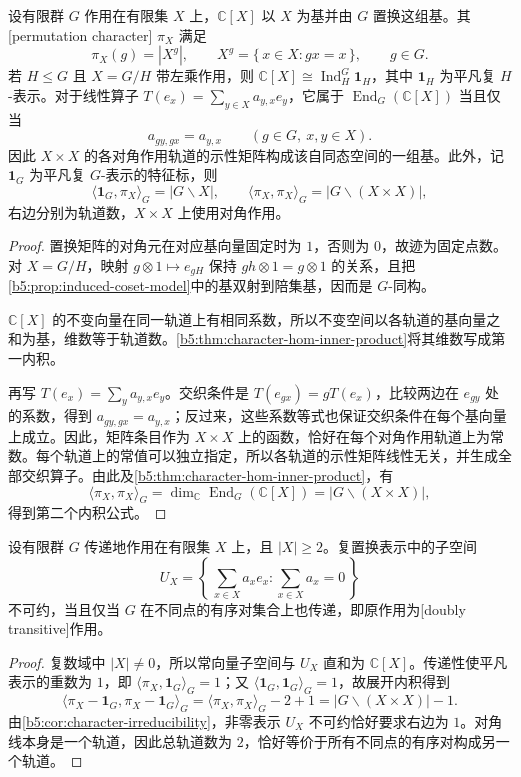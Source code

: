 \begin{proposition}\label{b5:prop:permutation-character}
	设有限群 \(G\) 作用在有限集 \(X\) 上，\(\mathbb C[X]\) 以 \(X\) 为基并由 \(G\) 置换这组基。其[permutation character] \(\pi_X\) 满足
	\[
		\pi_X(g)=|X^g|, \qquad X^g=\{\,x\in X:gx=x\,\},\qquad g\in G.
	\]
	若 \(H\le G\) 且 \(X=G/H\) 带左乘作用，则 \(\mathbb C[X]\cong\operatorname{Ind}_H^G\mathbf1_H\)，其中 \(\mathbf1_H\) 为平凡复 \(H\)-表示。对于线性算子 \(T(e_x)=\sum_{y\in X}a_{y,x}e_y\)，它属于 \(\operatorname{End}_G(\mathbb C[X])\) 当且仅当
	\[
		a_{gy,gx}=a_{y,x}\qquad(g\in G,\ x,y\in X).
	\]
	因此 \(X\times X\) 的各对角作用轨道的示性矩阵构成该自同态空间的一组基。此外，记 \(\mathbf1_G\) 为平凡复 \(G\)-表示的特征标，则
	\[
		\langle\mathbf1_G,\pi_X\rangle_G=|G\backslash X|, \qquad \langle\pi_X,\pi_X\rangle_G=|G\backslash(X\times X)|,
	\]
	右边分别为轨道数，\(X\times X\) 上使用对角作用。
\end{proposition}
\begin{proof}
	置换矩阵的对角元在对应基向量固定时为 \(1\)，否则为 \(0\)，故迹为固定点数。对 \(X=G/H\)，映射 \(g\otimes1\mapsto e_{gH}\) 保持 \(gh\otimes1=g\otimes1\) 的关系，且把\cref{b5:prop:induced-coset-model}中的基双射到陪集基，因而是 \(G\)-同构。

	\(\mathbb C[X]\) 的不变向量在同一轨道上有相同系数，所以不变空间以各轨道的基向量之和为基，维数等于轨道数。\cref{b5:thm:character-hom-inner-product}将其维数写成第一内积。

	再写 \(T(e_x)=\sum_y a_{y,x}e_y\)。交织条件是 \(T(e_{gx})=gT(e_x)\)，比较两边在 \(e_{gy}\) 处的系数，得到 \(a_{gy,gx}=a_{y,x}\)；反过来，这些系数等式也保证交织条件在每个基向量上成立。因此，矩阵条目作为 \(X\times X\) 上的函数，恰好在每个对角作用轨道上为常数。每个轨道上的常值可以独立指定，所以各轨道的示性矩阵线性无关，并生成全部交织算子。由此及\cref{b5:thm:character-hom-inner-product}，有
	\[
		\langle\pi_X,\pi_X\rangle_G =\dim_{\mathbb C}\operatorname{End}_G(\mathbb C[X]) =|G\backslash(X\times X)|,
	\]
	得到第二个内积公式。
\end{proof}

\begin{corollary}\label{b5:cor:two-transitive-augmentation}
	设有限群 \(G\) 传递地作用在有限集 \(X\) 上，且 \(|X|\ge2\)。复置换表示中的子空间
	\[
		U_X=\left\{\,\sum_{x\in X}a_xe_x:\sum_{x\in X}a_x=0\,\right\}
	\]
	不可约，当且仅当 \(G\) 在不同点的有序对集合上也传递，即原作用为[doubly transitive]作用。
\end{corollary}
\begin{proof}
	复数域中 \(|X|\ne0\)，所以常向量子空间与 \(U_X\) 直和为 \(\mathbb C[X]\)。传递性使平凡表示的重数为 \(1\)，即 \(\langle\pi_X,\mathbf1_G\rangle_G=1\)；又 \(\langle\mathbf1_G,\mathbf1_G\rangle_G=1\)，故展开内积得到
	\[
		\langle\pi_X-\mathbf1_G,\pi_X-\mathbf1_G\rangle_G =\langle\pi_X,\pi_X\rangle_G-2+1 =|G\backslash(X\times X)|-1.
	\]
	由\cref{b5:cor:character-irreducibility}，非零表示 \(U_X\) 不可约恰好要求右边为 \(1\)。对角线本身是一个轨道，因此总轨道数为 \(2\)，恰好等价于所有不同点的有序对构成另一个轨道。
\end{proof}

